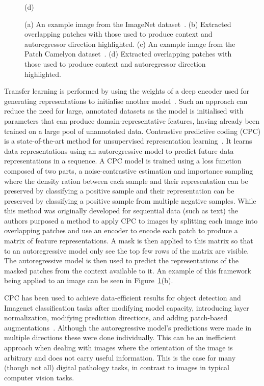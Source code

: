 \begin{figure}
\begin{minipage}[b]{.4\linewidth}
		\centerline{(d)}\medskip
	\end{minipage}
	\caption{(a) An example image from the ImageNet dataset~\cite{deng2009imagenet}. (b) Extracted overlapping patches with those used to produce context and autoregressor direction highlighted. (c) An example image from the Patch Camelyon dataset~\cite{veeling2018rotation}. (d) Extracted overlapping patches with those used to produce context and autoregressor direction highlighted.}
	\label{fig:example_cpc_patches}
\end{figure}

Transfer learning is performed by using the weights of a deep encoder used for generating representations to initialise another model~\citep{weiss2016survey}. Such an approach can reduce the need for large, annotated datasets as the model is initialised with parameters that can produce domain-representative features, having already been trained on a large pool of unannotated data. Contrastive predictive coding (CPC) is a state-of-the-art method for unsupervised representation learning~\citep{oord2018representation}. It learns data representations using an autoregressive model to predict future data representations in a sequence. A CPC model is trained using a loss function composed of two parts, a noise-contrastive estimation and importance sampling where the density ration between each sample and their representation can be preserved by classifying a positive sample and their representation can be preserved by classifying a positive sample from multiple negative samples. While this method was originally developed for sequential data (such as text) the authors purposed a method to apply CPC to images by splitting each image into overlapping patches and use an encoder to encode each patch to produce a matrix of feature representations. A mask is then applied to this matrix so that to an autoregressive model only see the top few rows of the matrix are visible. The autoregressive model is then used to predict the representations of the masked patches from the context available to it. An example of this framework being applied to an image can be seen in Figure~\ref{fig:example_cpc_patches}(b).

CPC has been used to achieve data-efficient results for object detection and Imagenet classification tasks after modifying model capacity, introducing layer normalization, modifying prediction directions, and adding patch-based augmentations~\citep{henaff2019data}. Although the autoregressive model’s predictions were made in multiple directions these were done individually. This can be an inefficient approach when dealing with images where the orientation of the image is arbitrary and does not carry useful information. This is the case for many (though not all) digital pathology tasks, in contrast to images in typical computer vision tasks.

